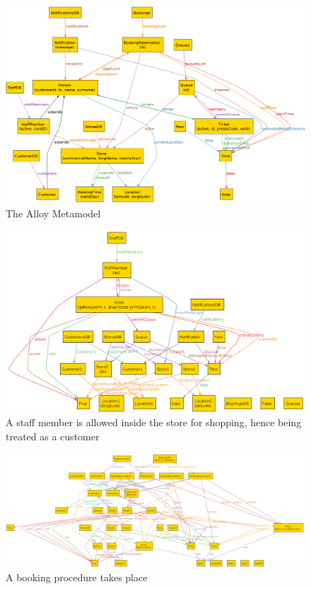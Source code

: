 \begin{figure} [H]
	\includegraphics[width=\linewidth]{../Alloy/metamodel.png}
	\caption{The Alloy Metamodel}
	\label{fig:AlloyMainModel}
\end{figure}

\begin{figure} [H]
	\includegraphics[width=\linewidth]{../Alloy/allowedInStaff.png}
	\caption{A staff member is allowed inside the store for shopping, hence being treated as a customer}
	\label{fig:allowedInStaff}
\end{figure}

\begin{figure} [H]
	\includegraphics[width=\linewidth]{../Alloy/book.png}
	\caption{A booking procedure takes place}
	\label{fig:alloyBook}
\end{figure}

